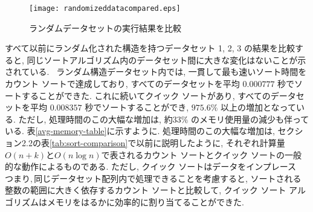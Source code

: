 \documentclass[a4j, 11pt]{jarticle}
\begin{document}
\begin{figure}[H]
  \centering
  \caption{ランダムデータセットの実行結果を比較}\label{combined-dataset-table-graph}
  \texttt{[image: randomizeddatacompared.eps]}
\end{figure}
すべて以前にランダム化された構造を持つデータセット 1, 2, 3 の結果を比較すると, 同じソートアルゴリズム内のデータセット間に大きな変化はないことが示されている. \
ランダム構造データセット内では, 一貫して最も速いソート時間をカウント ソートで達成しており, すべてのデータセットを平均 $0.000777$ 秒でソートすることができた. これに続いてクイック ソートがあり, すべてのデータセットを平均 $0.008357$ 秒でソートすることができ, $975.6\%$ 以上の増加となっている. ただし, 処理時間のこの大幅な増加は, 約$33\%$ のメモリ使用量の減少も伴っている. 表\ref{avg-memory-table}に示すように. 処理時間のこの大幅な増加は, セクション2.2の表\ref{tab:sort-comparison}で以前に説明したように, それぞれ計算量$O(n + k)$と$O(n \log n)$で表されるカウント ソートとクイック ソートの一般的な動作によるものである. ただし, クイック ソートはデータをインプレース \(つまり, 同じデータセット配列内 \)で処理できることを考慮すると, ソートされる整数の範囲に大きく依存するカウント ソートと比較して, クイック ソート アルゴリズムはメモリをはるかに効率的に割り当てることができた. \
\begin{table}[H]
  \centering
  \caption{各データセットにおけるソート手法別のメモリ使用量（KB）および平均使用量（データ長：100000）}\label{avg-memory-table}
\end{table}
\end{document}
